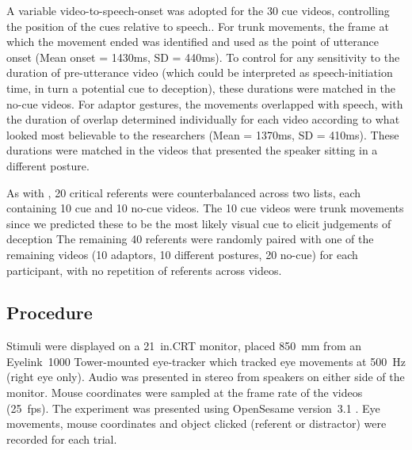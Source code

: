 \documentclass[a4paper,man,natbib]{apa6}
\begin{document}
A variable video-to-speech-onset was adopted for the 30 cue videos, controlling the position of the cues relative to speech..
For trunk movements, the frame at which the movement ended was identified and used as the point of utterance onset (Mean onset = 1430ms, SD = 440ms).
To control for any sensitivity to the duration of pre-utterance video (which could be interpreted as speech-initiation time, in turn a potential cue to deception), these durations were matched in the no-cue videos.
For adaptor gestures, the movements overlapped with speech, with the duration of overlap determined individually for each video according to what looked most believable to the researchers (Mean = 1370ms, SD = 410ms). %
These durations were matched in the videos that presented the speaker sitting in a different posture.

As with \citep{Loy2017}, 20 critical referents were counterbalanced across two lists, each containing 10 cue and 10 no-cue videos.
The 10 cue videos were trunk movements since we predicted these to be the most likely visual cue to elicit judgements of deception\citep{Vrij1996a}
The remaining 40 referents were randomly paired with one of the remaining videos (10 adaptors, 10 different postures, 20 no-cue) for each participant, with no repetition of referents across videos.

\subsection{Procedure}
Stimuli were displayed on a 21~in.\@ CRT monitor, placed 850~mm from an Eyelink~1000 Tower-mounted eye-tracker which tracked eye movements at 500~Hz (right eye only). 
Audio was presented in stereo from speakers on either side of the monitor. 
Mouse coordinates were sampled at the frame rate of the videos (25~fps). 
The experiment was presented using OpenSesame version~3.1 \citep{Mathot2012}.
Eye movements, mouse coordinates and object clicked (referent or distractor) were recorded for each trial.
\end{document}
